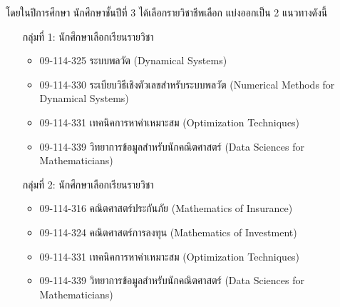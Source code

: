 โดยในปีการศึกษา \printyear{}  นักศึกษาชั้นปีที่ 3 ได้เลือกรายวิชาชีพเลือก แบ่งออกเป็น 2 แนวทางดังนี้
\begin{enumerate}
	\item[กลุ่มที่ 1:] นักศึกษาเลือกเรียนรายวิชา
\begin{itemize}
	\item 09-114-325 ระบบพลวัต (Dynamical Systems)
	\item 09-114-330 ระเบียบวิธีเชิงตัวเลขสำหรับระบบพลวัต (Numerical Methods for Dynamical Systems)
	\item 09-114-331 เทคนิคการหาค่าเหมาะสม (Optimization Techniques)
	\item 09-114-339 วิทยาการข้อมูลสำหรับนักคณิตศาสตร์ (Data Sciences for Mathematicians)
\end{itemize}
\item[กลุ่มที่ 2:] นักศึกษาเลือกเรียนรายวิชา
\begin{itemize}
  \item 09-114-316 คณิตศาสตร์ประกันภัย (Mathematics of Insurance)
 \item 09-114-324 คณิตศาสตร์การลงทุน (Mathematics of Investment)
\item 09-114-331 เทคนิคการหาค่าเหมาะสม (Optimization Techniques)
	\item 09-114-339 วิทยาการข้อมูลสำหรับนักคณิตศาสตร์ (Data Sciences for Mathematicians)
\end{itemize}
\end{enumerate}

\begin{doclist}
\end{doclist}


